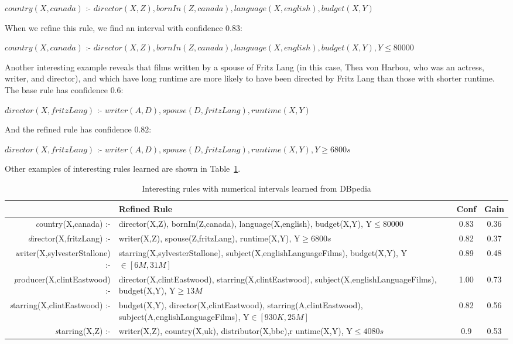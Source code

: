 $country(X,canada)$ :- $director(X,Z),bornIn(Z,canada),language(X,english),budget(X,Y)$

When we refine this rule, we find an interval with confidence $0.83$:

$country(X,canada)$ :- $director(X,Z),bornIn(Z,canada),language(X,english),budget(X,Y),Y\leq 80000$

Another interesting example reveals that films written by a spouse of Fritz Lang (in this case, Thea von
Harbou, who was an actress, writer, and director), and which have long runtime are more likely to have been directed by
Fritz Lang than those with shorter runtime. The base rule has confidence $0.6$:

$director(X,fritzLang)$ :- $writer(A,D),spouse(D,fritzLang),runtime(X,Y)$

And the refined rule has confidence $0.82$:

$director(X,fritzLang)$ :- $writer(A,D),spouse(D,fritzLang),runtime(X,Y),Y\geq 6800s$

Other examples of interesting rules learned are shown in Table~\ref{tab:mdbRuleExamples}.

\begin{table}[h!]
\begin{minipage}{\textwidth}
 \begin{center}
 \caption{Interesting rules with numerical intervals learned from DBpedia}
  \begin{tabular}{ >{\emph}r >{\raggedright}p{7cm} | c | c }
    \toprule
      & Refined Rule				& Conf 	& Gain \\
    \midrule
      country(X,canada) :-&director(X,Z), bornIn(Z,canada), language(X,english), budget(X,Y), Y$\leq 80000$ &
      0.83	& 0.36 \\ \hline
      director(X,fritzLang) :-&writer(X,Z), spouse(Z,fritzLang), runtime(X,Y), Y$\geq 6800s$ & 
      0.82	& 0.37 \\ \hline
      writer(X,sylvesterStallone) :-&starring(X,sylvesterStallone), subject(X,englishLanguageFilms),
      budget(X,Y), Y$\in [6M,31M]$ &
      0.89	& 0.48 \\ \hline
      producer(X,clintEastwood) :-&director(X,clintEastwood), starring(X,clintEastwood),
      subject(X,englishLanguageFilms), budget(X,Y), Y$\geq 13M$ &
      1.00	& 0.73 \\ \hline
      starring(X,clintEastwood) :- &budget(X,Y), director(X,clintEastwood), starring(A,clintEastwood), 
      subject(A,englishLanguageFilms), Y$\in [930K,25M]$&
      0.82	& 0.56 \\ \hline
      starring(X,Z) :-&writer(X,Z), country(X,uk), distributor(X,bbc),r untime(X,Y), Y$\leq 4080s$ &
      0.9	& 0.53 \\ \hline

    \bottomrule
  \end{tabular}
 \label{tab:mdbRuleExamples}
 \end{center}
\end{minipage}
\end{table}


